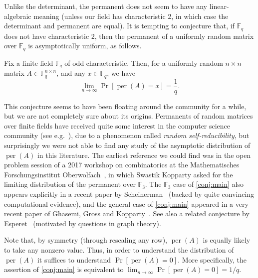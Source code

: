 \documentclass[10pt,reqno]{amsart}
\numberwithin{equation}{section}
\theoremstyle{remark}
\newcommand{\mb}{\mathbb}
\newcommand{\on}{\operatorname}
\begin{document}
Unlike the determinant, the permanent does not seem to have any linear-algebraic meaning (unless our field has characteristic 2, in which case the determinant and permanent are equal). It is tempting to conjecture that, if $\mb F_q$ does not have characteristic 2, then the permanent of a uniformly random matrix over $\mb F_q$ is asymptotically uniform, as follows.
\begin{conjecture}
\label{conj:main}Fix a finite field $\mathbb{F}_{q}$ of odd characteristic.
Then, for a uniformly random $n\times n$ matrix $A\in\mathbb{F}_q^{n\times n}$,
and any $x\in\mathbb{F}_q$, we have
\[
\lim_{n\to\infty}\Pr[\on{per}(A)=x]=\frac{1}{q}.
\]
\end{conjecture}
This conjecture seems to have been floating around the community for a while, but we are not completely sure about its origins. Permanents of random matrices over finite fields have received quite some interest in the computer science community (see e.g.\ \cite{FL96,Lip91,GLRSW91,GS92,CPS99}), due to a phenomenon called \emph{random self-reducibility}, but surprisingly we were not able to find any study of the asymptotic distribution of $\on{per}(A)$ in this literature. The earliest reference we could find was in the open problem session of a 2017 workshop on combinatorics at the Mathematisches Forschungsinstitut Oberwolfach~\cite{Kop17}, in which Swastik Kopparty asked for the limiting distribution of the permanent over $\mb F_3$. The $\mb F_3$ case of \cref{conj:main} also appears explicitly in a recent paper by Scheinerman~\cite{Sch24} (backed by quite convincing computational evidence), and the general case of \cref{conj:main} appeared in a very recent paper of Ghasemi, Gross and Kopparty~\cite{GGK25}. See also a related conjecture by Esperet~\cite{Esp22} (motivated by questions in graph theory).

Note that, by symmetry (through rescaling any row), $\on{per}(A)$ is equally likely to take any nonzero value. Thus, in order to understand the distribution of $\on{per}(A)$ it suffices to understand $\Pr[\on{per}(A)=0]$. More specifically, the assertion of \cref{conj:main} is equivalent to $\lim_{n\to\infty}\Pr[\on{per}(A)=0]=1/q$.
\end{document}
